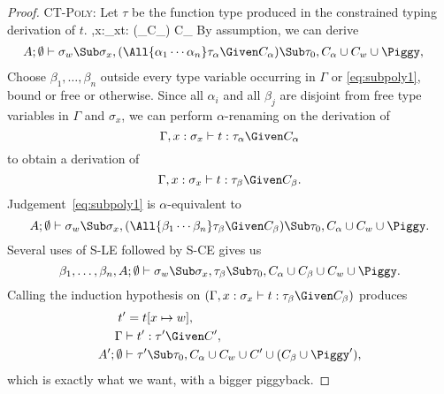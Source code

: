 \begin{proof}
\Case\textsc{CT-Poly}: Let $\tau$ be the function type produced
in the constrained typing derivation of $t$.
{\Gamma,x:\sigma_x\vdash t:
(\tau_\alpha\Given C_\alpha)
\Given C_\alpha}
%
By assumption, we can derive
\begin{align}
A;\Exigent &\vdash \sigma_w\Sub\sigma_x,
(\All{\alpha_1\cdots\alpha_n}\tau_\alpha\Given
C_\alpha)\Sub\tau_0,
C_\alpha\cup C_w\cup\Piggy,
\label{eq:subpoly1}
\end{align}
Choose $\beta_1,\ldots,\beta_n$ outside every type variable
occurring in $\Gamma$ or \eqref{eq:subpoly1}, bound or free or
otherwise. Since all $\alpha_i$ and all $\beta_j$ are disjoint
from free type variables in $\Gamma$ and $\sigma_x$, we can
perform $\alpha$-renaming on the derivation of
\[
\Gamma,x:\sigma_x\vdash t : \tau_\alpha\Given C_\alpha
\]
to obtain a derivation of
\def\tBeta{\Gamma,x:\sigma_x\vdash t : \tau_\beta\Given C_\beta}
\[
\tBeta.
\]
Judgement~\eqref{eq:subpoly1} is $\alpha$-equivalent to
\[
A;\Exigent \vdash \sigma_w\Sub\sigma_x,
(\All{\beta_1\cdots\beta_n}\tau_\beta\Given
C_\beta)\Sub\tau_0,
C_\alpha\cup C_w\cup\Piggy.
\]
Several uses of \textsc{S-LE} followed by \textsc{S-CE} gives us
\[
\beta_1,\ldots,\beta_n,A;\Exigent \vdash \sigma_w\Sub\sigma_x,
\tau_\beta\Sub\tau_0,
C_\alpha\cup C_\beta\cup C_w\cup\Piggy.
\]
Calling the induction hypothesis on $(\tBeta)$ produces
\begin{align}
t&'=t[x\mapsto\Xdef],\notag\\
\Gamma&\vdash t':\tau'\Given C',
\label{eq:subpoly2}
\\
A';\Exigent&\vdash
\tau'\Sub\tau_0,
C_\alpha\cup C_w\cup C'\cup(C_\beta\cup\Piggy'),
\label{eq:subpoly3}
\end{align}
which is exactly what we want, with a bigger piggyback.
\end{proof}
